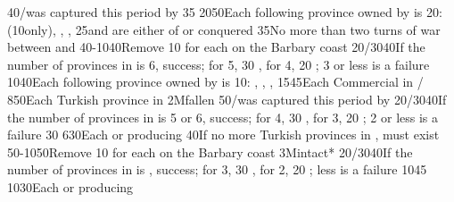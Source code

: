 %
%
{}{40}{\provinceOsterreich/\villeVienne was captured this period by \TUR}%
%
%
{}{35}{}%
%
%
{20}{50}{Each following province owned by \TUR is 20\VPs: \provinceCyclades
  (10\VPs only), \provinceKreta, \provinceMalta, \provinceChypre}%
%
%
{}{25}{\paysvalachie and \paysmoldavie are either \VASSAL of \TUR or
  conquered}%
%
%
%
{}{35}{No more than two turns of war between \AUSaus and \TUR}%
%
%
{40-10}{40}{Remove 10 \VPs for each \Presidio on the Barbary coast}%
%
%
{20/30}{40}{If the number of provinces in \payscrimee is 6, success; for 5, 30
  \VPs, for 4, 20 \VPs; 3 or less is a failure}%
%
%
{10}{40}{Each following province owned by \TUR is 10\VPs: \provinceCorfou,
  \provinceKreta, \provinceMalta, \provinceChypre}%
%
%
{15}{45}{Each Commercial  in \CTZ/\STZ}
%
%
%
{8}{50}{Each Turkish province in \payshongrie}%
%
\EUobjective2M{\villeVienne fallen}{}%
{}{50}{\provinceOsterreich/\villeVienne was captured this period by \TUR}%
%
%
{20/30}{40}{If the number of provinces in \payscrimee is 5 or 6, success; for
  4, 30 \VPs, for 3, 20 \VPs; 2 or less is a failure}%
%
%
{}{30}{}%
%
%
{6}{30}{Each \COL or \TP producing \POSPICE}%
%
%
%
%
{}{40}{If no more Turkish provinces in \payshongrie, \paystransylvanie must
  exist}%
%
%
%
{50-10}{50}{Remove 10 \VPs for each \Presidio on the Barbary coast}%
%
\EUobjective3M{\payscrimee intact*}{}%
{20/30}{40}{If the number of provinces in \payscrimee is , success; for
  3, 30 \VPs, for 2, 20 \VPs; less is a failure}%
%
%
{10}{45}{}%
%
%
{10}{30}{Each \COL or \TP producing \POSPICE}%
%
%
%
